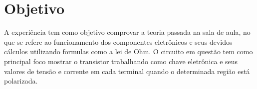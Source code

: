 \chapter[Objetivo]{Objetivo}
A experiência tem como objetivo comprovar a teoria passada na sala de aula, no que se refere ao funcionamento dos componentes eletrônicos e seus devidos cálculos utilizando formulas como a lei de Ohm.
O circuito em questão tem como principal foco mostrar o transistor trabalhando como chave eletrônica e seus valores de tensão e corrente em cada terminal
quando o determinada região está polarizada.